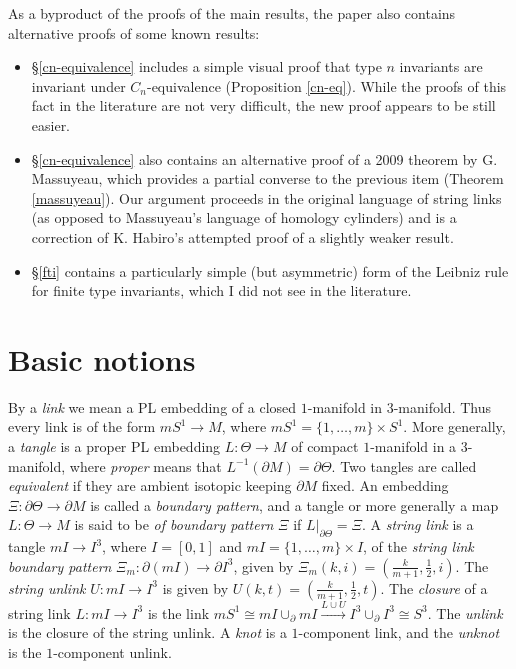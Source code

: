 \documentclass[a4paper,12pt,reqno,oneside]{amsart} %
\theoremstyle{plain}
\theoremstyle{definition}
\theoremstyle{named}
\def\x{\times}
\renewcommand{\:}{\colon}
\def\xr#1{\xrightarrow{#1}}
\begin{document}
As a byproduct of the proofs of the main results, the paper also contains alternative proofs of some known results:
\begin{itemize}
\item \S\ref{cn-equivalence} includes a simple visual proof that type $n$ invariants are invariant
under $C_n$-equivalence (Proposition \ref{cn-eq}).
While the proofs of this fact in the literature are not very difficult, the new proof appears to be still easier.
\item \S\ref{cn-equivalence} also contains an alternative proof of a 2009 theorem by G. Massuyeau, which provides 
a partial converse to the previous item (Theorem \ref{massuyeau}).
Our argument proceeds in the original language of string links (as opposed to Massuyeau's language of homology cylinders)
and is a correction of K. Habiro's attempted proof of a slightly weaker result.
\item \S\ref{fti} contains a particularly simple (but asymmetric) form of the Leibniz rule for finite type invariants,
which I did not see in the literature.
\end{itemize} 


\section{Basic notions} \label{basic}

By a {\it link} we mean a PL embedding of a closed $1$-manifold in $3$-manifold.
Thus every link is of the form $mS^1\to M$, where $mS^1=\{1,\dots,m\}\x S^1$.
More generally, a {\it tangle} is a proper PL embedding $L\:\Theta\to M$ of compact $1$-manifold in a $3$-manifold, 
where {\it proper} means that $L^{-1}(\partial M)=\partial\Theta$.
Two tangles are called {\it equivalent} if they are ambient isotopic keeping $\partial M$ fixed.
An embedding $\Xi\:\partial\Theta\to\partial M$ is called a {\it boundary pattern}, and a tangle or more generally
a map $L\:\Theta\to M$ is said to be {\it of boundary pattern} $\Xi$ if $L|_{\partial\Theta}=\Xi$.
A {\it string link} is a tangle $mI\to I^3$, where $I=[0,1]$ and $mI=\{1,\dots,m\}\x I$, of the 
{\it string link boundary pattern} $\Xi_m\:\partial(mI)\to\partial I^3$, given by $\Xi_m(k,i)=(\frac{k}{m+1},\frac12,i)$.
The {\it string unlink} $U\:mI\to I^3$ is given by $U(k,t)=(\frac{k}{m+1},\frac12,t)$.
The {\it closure} of a string link $L\:mI\to I^3$ is the link 
$mS^1\cong mI\cup_\partial mI\xr{L\cup U}I^3\cup_\partial I^3\cong S^3$.
The {\it unlink} is the closure of the string unlink.
A {\it knot} is a $1$-component link, and the {\it unknot} is the $1$-component unlink.
\end{document}
